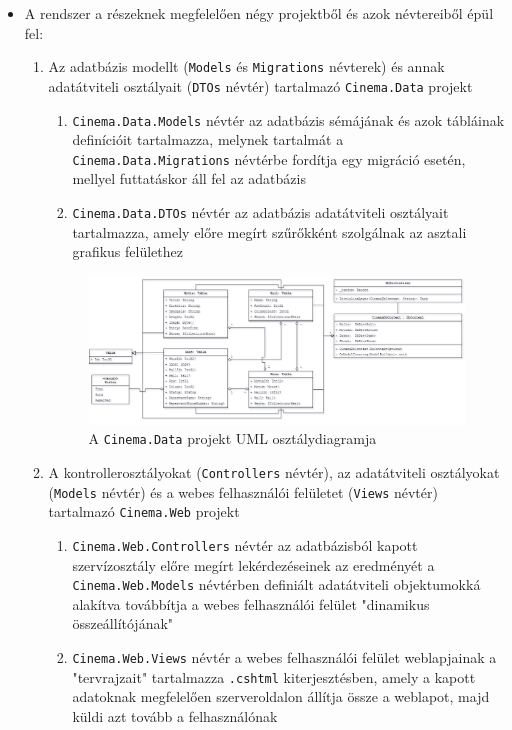 \documentclass{article}
\begin{document}
	\begin{itemize}
		\item A rendszer a részeknek megfelelően négy projektből és azok névtereiből épül fel:
		\begin{enumerate}
			\item Az adatbázis modellt (\texttt{Models} és \texttt{Migrations} névterek) és annak adatátviteli osztályait (\texttt{DTOs} névtér) tartalmazó \texttt{Cinema.Data} projekt
			\begin{enumerate}
				\item \texttt{Cinema.Data.Models} névtér az adatbázis sémájának és azok tábláinak definícióit tartalmazza, melynek tartalmát a \texttt{Cinema.Data.Migrations} névtérbe fordítja egy migráció esetén, mellyel futtatáskor áll fel az adatbázis
				\item \texttt{Cinema.Data.DTOs} névtér az adatbázis adatátviteli osztályait tartalmazza, amely előre megírt szűrőkként szolgálnak az asztali grafikus felülethez
			\end{enumerate}
			\begin{figure}[H]
				\centering
				\includegraphics[width=1\textwidth]{data}
				\caption{A \texttt{Cinema.Data} projekt UML osztálydiagramja}
			\end{figure}\newpage
			\item A kontrollerosztályokat (\texttt{Controllers} névtér), az adatátviteli osztályokat (\texttt{Models} névtér) és a webes felhasználói felületet (\texttt{Views} névtér) tartalmazó \texttt{Cinema.Web} projekt
			\begin{enumerate}
				\item \texttt{Cinema.Web.Controllers} névtér az adatbázisból kapott szervízosztály előre megírt lekérdezéseinek az eredményét a \texttt{Cinema.Web.Models} névtérben definiált adatátviteli objektumokká alakítva továbbítja a webes felhasználói felület "dinamikus összeállítójának"
				\item \texttt{Cinema.Web.Views} névtér a webes felhasználói felület weblapjainak a "tervrajzait" tartalmazza \texttt{.cshtml} kiterjesztésben, amely a kapott adatoknak megfelelően szerveroldalon állítja össze a weblapot, majd küldi azt tovább a felhasználónak

\end{enumerate}
\end{enumerate}
\end{itemize}
\end{document}
